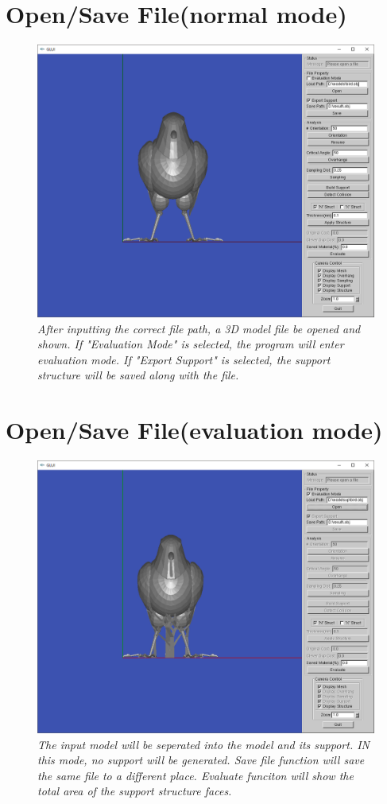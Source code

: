 \documentclass[11pt, a4paper]{article}
\begin{document}
	\section{Open/Save File(normal mode)}
	\begin{figure}[H]
  		\centering
      	\includegraphics[width=1.0\textwidth]{open.png}
  	\caption{\textit{After inputting the correct file path, a 3D model file be opened and shown. If "Evaluation Mode" is selected, the program will enter evaluation mode. If "Export Support" is selected, the support structure will be saved along with the file.}}
	\end{figure}
	\section{Open/Save File(evaluation mode)}
	\begin{figure}[H]
  		\centering
      	\includegraphics[width=1.0\textwidth]{emode.png}
  	\caption{\textit{The input model will be seperated into the model and its support. IN this mode, no support will be generated. Save file function will save the same file to a different place. Evaluate funciton will show the total area of the support structure faces.}}
	\end{figure}
\end{document}
